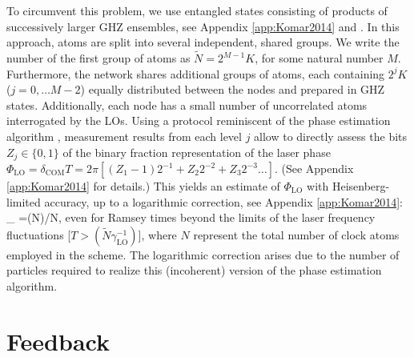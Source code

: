 To circumvent this problem, we use entangled states consisting of products of
successively larger GHZ ensembles, see Appendix \ref{app:Komar2014} and 
\cite{Kessler2014}. In this approach, 
atoms are split into
several independent, shared groups.
We write the number of the first group of atoms as $\tilde N =2^{M-1} K$, for
some natural number $M$.
Furthermore, the network shares additional groups of atoms, each containing
$2^{j} K$ ($j=0, \hdots M-2$) equally distributed between the nodes and prepared
in GHZ states. 
Additionally, each node has a small number of uncorrelated atoms interrogated by
the LOs. Using a protocol reminiscent of the phase estimation algorithm
\cite{Kessler2014,Nielsen_Chuang, Giedke2006}, measurement results from each
level $j$ allow to directly assess the bits $Z_j \in \{0,1\}$ of the binary
fraction representation of the laser phase $\Phi_\mathrm{LO}=\delta_\mathrm{COM} T
=2\pi [(Z_1-1) 2^{-1} + Z_2 2^{-2} + Z_3 2^{-3} \hdots]$.
(See Appendix \ref{app:Komar2014} for details.)
This
yields an estimate of $\Phi_\mathrm{LO}$ with Heisenberg-limited accuracy, up to a
logarithmic correction, see Appendix \ref{app:Komar2014}:
\bel 
	\Delta \Phi_ =\log(N)/N,
	\label{eq2}
\eel 
even for Ramsey times beyond the limits of the laser frequency fluctuations [$T
> (\tilde N\gamma_\mathrm{LO}^{-1})$], where $N$ represent the total number of
clock atoms employed in the scheme. The logarithmic correction arises due to the
number of particles required to realize this (incoherent) version of the phase
estimation algorithm.

\section{Feedback}

